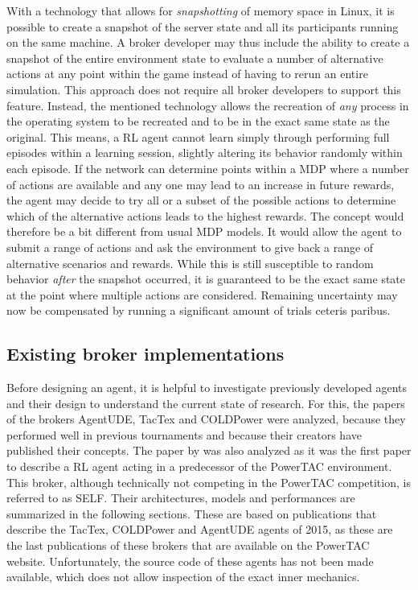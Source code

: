 With a technology that allows for \emph{snapshotting} of memory space in Linux, it is possible to create a snapshot of
the server state and all its participants running on the same machine. A broker developer may thus include the
ability to create a snapshot of the entire environment state to evaluate a number of alternative actions at any point
within the game instead of having to rerun an entire simulation. This approach does not require all broker developers to
support this feature. Instead, the mentioned technology allows the recreation of \emph{any} process in the operating
system to be recreated and to be in the exact same state as the original. This means, a \ac{RL} agent cannot learn simply
through performing full episodes within a learning session, slightly altering its behavior randomly within each episode.
If the network can determine points within a \ac{MDP} where a number of actions are available and any one may lead to an
increase in future rewards, the agent may decide to try all or a subset of the possible actions to determine which of
the alternative actions leads to the highest rewards. The concept would therefore be a bit different from usual \ac{MDP}
models. It would allow the agent to submit a range of actions and ask the environment to give back a range of
alternative scenarios and rewards. While this is still susceptible to random behavior \emph{after} the snapshot occurred,
it is guaranteed to be the exact same state at the point where multiple actions are considered. Remaining uncertainty
may now be compensated by running a significant amount of trials ceteris paribus.




\subsection{Existing broker implementations}%
\label{sub:existing_broker_concepts}
Before designing an agent, it is helpful to investigate previously developed agents and their design to understand
the current state of research. For this, the papers of the brokers AgentUDE, TacTex and COLDPower were analyzed, because they
performed well in previous tournaments and because their creators have published their concepts. The
paper by \citet{peters2013reinforcement} was also analyzed as it was the first paper to describe a \ac{RL} agent acting in a predecessor
of the \ac{PowerTAC} environment. This broker, although technically not competing in the \ac{PowerTAC} competition, is
referred to as \ac{SELF}. Their architectures,
models and performances are summarized in the following sections. These are based on publications that describe the
TacTex, COLDPower and AgentUDE agents of 2015, as these are the last publications of these brokers that are available on
the \ac{PowerTAC} website. Unfortunately, the source code of these agents has not been made available, which does not
allow inspection of the exact inner mechanics.

